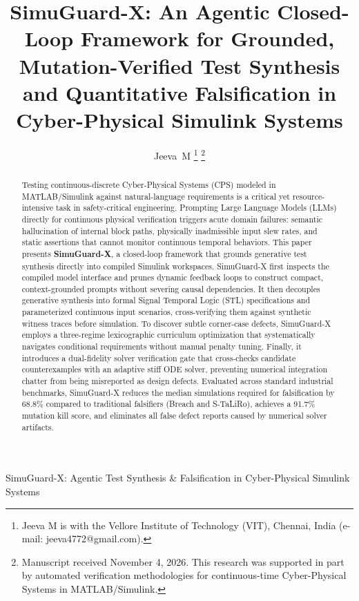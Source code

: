 \documentclass[journal]{IEEEtran}
\begin{document}
\title{SimuGuard-X: An Agentic Closed-Loop Framework for Grounded, Mutation-Verified Test Synthesis and Quantitative Falsification in Cyber-Physical Simulink Systems}

\author{Jeeva~M%
\thanks{Jeeva M is with the Vellore Institute of Technology (VIT), Chennai, India (e-mail: jeeva4772@gmail.com).}%
\thanks{Manuscript received November 4, 2026. This research was supported in part by automated verification methodologies for continuous-time Cyber-Physical Systems in MATLAB/Simulink.}}

%
{SimuGuard-X: Agentic Test Synthesis \& Falsification in Cyber-Physical Simulink Systems}

\maketitle

\begin{abstract}
Testing continuous-discrete Cyber-Physical Systems (CPS) modeled in MATLAB/Simulink against natural-language requirements is a critical yet resource-intensive task in safety-critical engineering. Prompting Large Language Models (LLMs) directly for continuous physical verification triggers acute domain failures: semantic hallucination of internal block paths, physically inadmissible input slew rates, and static assertions that cannot monitor continuous temporal behaviors. This paper presents \textbf{SimuGuard-X}, a closed-loop framework that grounds generative test synthesis directly into compiled Simulink workspaces. SimuGuard-X first inspects the compiled model interface and prunes dynamic feedback loops to construct compact, context-grounded prompts without severing causal dependencies. It then decouples generative synthesis into formal Signal Temporal Logic (STL) specifications and parameterized continuous input scenarios, cross-verifying them against synthetic witness traces before simulation. To discover subtle corner-case defects, SimuGuard-X employs a three-regime lexicographic curriculum optimization that systematically navigates conditional requirements without manual penalty tuning. Finally, it introduces a dual-fidelity solver verification gate that cross-checks candidate counterexamples with an adaptive stiff ODE solver, preventing numerical integration chatter from being misreported as design defects. Evaluated across standard industrial benchmarks, SimuGuard-X reduces the median simulations required for falsification by 68.8\% compared to traditional falsifiers (Breach and S-TaLiRo), achieves a 91.7\% mutation kill score, and eliminates all false defect reports caused by numerical solver artifacts.
\end{abstract}
\end{document}
